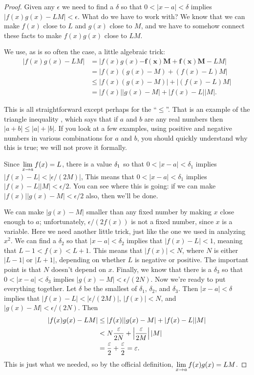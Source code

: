 \begin{proof} 
Given any $\epsilon$ we need to find a $\delta$ so that
$0<|x-a|<\delta$ implies $|f(x)g(x)-LM|<\epsilon$. What do we have to
work with? We know that we can make $f(x)$ close to $L$ and $g(x)$
close to $M$, and we have to somehow connect these facts to make
$f(x)g(x)$ close to $LM$.

We use, as is so often the case, a little algebraic
trick: 
\begin{align*}
|f(x)g(x)-LM| &= |f(x)g(x)\boldsymbol{-f(x)M+f(x)M}-LM| \\
&=|f(x)(g(x)-M)+(f(x)-L)M| \\
&\le |f(x)(g(x)-M)|+|(f(x)-L)M| \\
&=|f(x)||g(x)-M|+|f(x)-L||M|.
\end{align*}

This is all straightforward except perhaps for the ``$\le$''. That is
an example of the {\dfont triangle inequality%
}, 
which says that if $a$ and $b$ are any real
numbers then $|a+b|\le |a|+|b|$. If you look at a few examples, using
positive and negative numbers in various combinations for $a$ and $b$,
you should quickly understand why this is true; we will not prove it
formally. 

Since $\ds \lim_{x\to a}f(x) =L$, there is a value $\ds \delta_1$ so that
$0<|x-a|<\delta_1$ implies $|f(x)-L|<|\epsilon/(2M)|$, 
This means that $0<|x-a|<\delta_1$ implies
$|f(x)-L||M|< \epsilon/2$. You can see where this is going: if we can
make $|f(x)||g(x)-M|<\epsilon/2$ also, then we'll be done.

We can make $|g(x)-M|$ smaller than any fixed number by making $x$
close enough to $a$; unfortunately, $\epsilon/(2f(x))$ is not a fixed
number, since $x$ is a variable. Here we need another little trick,
just like the one we used in analyzing $x^2$. We can find a $\delta_2$
so that $|x-a|<\delta_2$ implies that $|f(x)-L|<1$, meaning that $L-1
< f(x) < L+1$. This means that $|f(x)|<N$, where $N$ is either $|L-1|$
or $|L+1|$, depending on whether $L$ is negative or positive. The
important point is that $N$ doesn't depend on $x$. Finally, we know that
there is a $\delta_3$ so that $0<|x-a|<\delta_3$ implies
$|g(x)-M|<\epsilon/(2N)$. Now we're ready to put everything
together. Let $\delta$ be the smallest of $\delta_1$, $\delta_2$, and
$\delta_3$. Then $|x-a|<\delta$ implies that
$|f(x)-L|<|\epsilon/(2M)|$, $|f(x)|<N$, and
$|g(x)-M|<\epsilon/(2N)$. Then 
\begin{align*}
|f(x)g(x)-LM|&\le|f(x)||g(x)-M|+|f(x)-L||M| \\
&<N{\epsilon\over 2N}+\left|{\epsilon\over 2M}\right||M| \\
&={\epsilon\over 2}+{\epsilon\over 2}=\epsilon.
\end{align*}
This is just what we needed, so by the official definition,
$\ds \lim_{x\to a}f(x)g(x)=LM$.
\end{proof}




